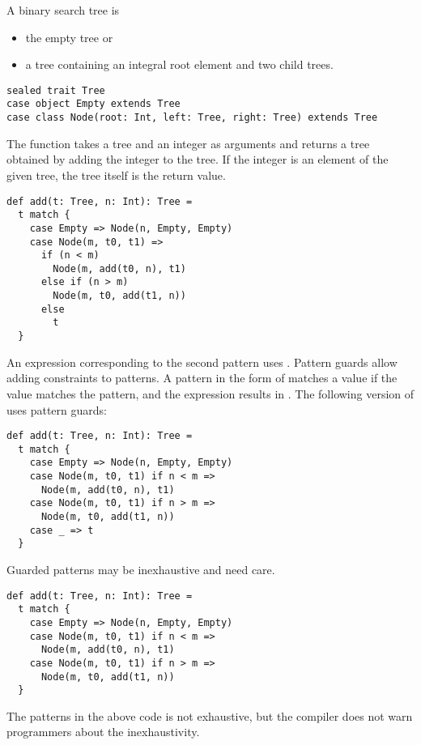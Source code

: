 A binary search tree is

\begin{itemize}
\item the empty tree or
\item a tree containing an integral root element and two child trees.
\end{itemize}

\begin{verbatim}
sealed trait Tree
case object Empty extends Tree
case class Node(root: Int, left: Tree, right: Tree) extends Tree
\end{verbatim}

The function  takes a tree and an integer as arguments and returns a tree
obtained by adding the integer to the tree. If the integer is an element of the
given tree, the tree itself is the return value.

\begin{verbatim}
def add(t: Tree, n: Int): Tree =
  t match {
    case Empty => Node(n, Empty, Empty)
    case Node(m, t0, t1) =>
      if (n < m)
        Node(m, add(t0, n), t1)
      else if (n > m)
        Node(m, t0, add(t1, n))
      else
        t
  }
\end{verbatim}

An expression corresponding to the second pattern uses . Pattern
guards allow adding constraints to patterns. A pattern in the form of
 matches a value if the value matches the
pattern, and the expression results in . The following version of 
uses pattern guards:

\begin{verbatim}
def add(t: Tree, n: Int): Tree =
  t match {
    case Empty => Node(n, Empty, Empty)
    case Node(m, t0, t1) if n < m =>
      Node(m, add(t0, n), t1)
    case Node(m, t0, t1) if n > m =>
      Node(m, t0, add(t1, n))
    case _ => t
  }
\end{verbatim}

Guarded patterns may be inexhaustive and need care.

\begin{verbatim}
def add(t: Tree, n: Int): Tree =
  t match {
    case Empty => Node(n, Empty, Empty)
    case Node(m, t0, t1) if n < m =>
      Node(m, add(t0, n), t1)
    case Node(m, t0, t1) if n > m =>
      Node(m, t0, add(t1, n))
  }
\end{verbatim}

The patterns in the above code is not exhaustive, but
the compiler does not warn programmers about the inexhaustivity.

